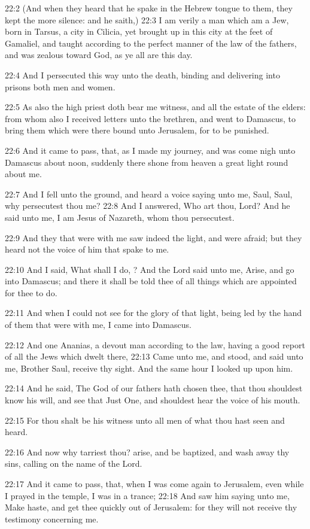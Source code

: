 22:2 (And when they heard that he spake in the Hebrew tongue to them, they kept the more silence: and he saith,) 22:3 I am verily a man which am a Jew, born in Tarsus, a city in Cilicia, yet brought up in this city at the feet of Gamaliel, and taught according to the perfect manner of the law of the fathers, and was zealous toward God, as ye all are this day.

22:4 And I persecuted this way unto the death, binding and delivering into prisons both men and women.

22:5 As also the high priest doth bear me witness, and all the estate of the elders: from whom also I received letters unto the brethren, and went to Damascus, to bring them which were there bound unto Jerusalem, for to be punished.

22:6 And it came to pass, that, as I made my journey, and was come nigh unto Damascus about noon, suddenly there shone from heaven a great light round about me.

22:7 And I fell unto the ground, and heard a voice saying unto me, Saul, Saul, why persecutest thou me?  22:8 And I answered, Who art thou, Lord? And he said unto me, I am Jesus of Nazareth, whom thou persecutest.

22:9 And they that were with me saw indeed the light, and were afraid; but they heard not the voice of him that spake to me.

22:10 And I said, What shall I do, \LORD? And the Lord said unto me, Arise, and go into Damascus; and there it shall be told thee of all things which are appointed for thee to do.

22:11 And when I could not see for the glory of that light, being led by the hand of them that were with me, I came into Damascus.

22:12 And one Ananias, a devout man according to the law, having a good report of all the Jews which dwelt there, 22:13 Came unto me, and stood, and said unto me, Brother Saul, receive thy sight. And the same hour I looked up upon him.

22:14 And he said, The God of our fathers hath chosen thee, that thou shouldest know his will, and see that Just One, and shouldest hear the voice of his mouth.

22:15 For thou shalt be his witness unto all men of what thou hast seen and heard.

22:16 And now why tarriest thou? arise, and be baptized, and wash away thy sins, calling on the name of the Lord.

22:17 And it came to pass, that, when I was come again to Jerusalem, even while I prayed in the temple, I was in a trance; 22:18 And saw him saying unto me, Make haste, and get thee quickly out of Jerusalem: for they will not receive thy testimony concerning me.

